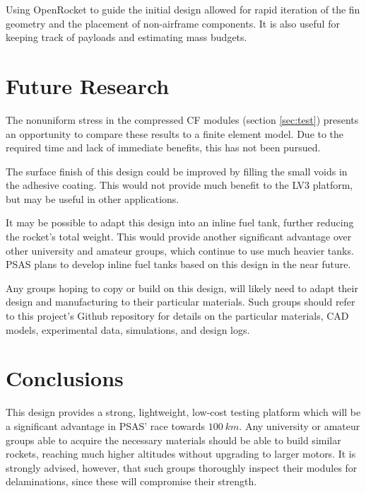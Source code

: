 \documentclass{aiaa-tc}%
\begin{document}
Using OpenRocket to guide the initial design allowed for rapid iteration of the fin geometry and the placement of non-airframe components. 
It is also useful for keeping track of payloads and estimating mass budgets.

\section{Future Research}

The nonuniform stress in the compressed CF modules (section \ref{sec:test}) presents an opportunity to compare these results to a finite element model. 
Due to the required time and lack of immediate benefits, this has not been pursued.

The surface finish of this design could be improved by filling the small voids in the adhesive coating. 
This would not provide much benefit to the LV3 platform, but may be useful in other applications.

It may be possible to adapt this design into an inline fuel tank, further reducing the rocket's total weight.
This would provide another significant advantage over other university and amateur groups, which continue to use much heavier tanks.
PSAS plans to develop inline fuel tanks based on this design in the near future. 

Any groups hoping to copy or build on this design, will likely need to adapt their design and manufacturing to their particular materials. 
Such groups should refer to this project's Github repository\cite{LV3repo} for details on the particular materials, CAD models, experimental data, simulations, and design logs.


\section{Conclusions}

This design provides a strong, lightweight, low-cost testing platform which will be a significant advantage in PSAS' race towards $\SI{100}{km}$.
Any university or amateur groups able to acquire the necessary materials should be able to build similar rockets, reaching much higher altitudes without upgrading to larger motors. 
It is strongly advised, however, that such groups thoroughly inspect their modules for delaminations, since these will compromise their strength. 
\end{document}
